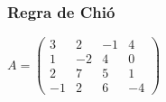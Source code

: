 \documentclass[pdftex, brazil]{beamer}
\begin{document}
\begin{frame}[t]
  \frametitle{Regra de Chió}
  $A = \begin{pmatrix}
    3 & 2 & -1 & 4\\
    1 & -2 & 4 & 0\\
    2 & 7 & 5 & 1\\
    -1 & 2 & 6 & -4\end{pmatrix}$
\end{frame}




\end{document}
